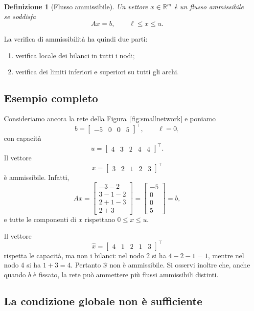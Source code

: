 \documentclass[11pt,a4paper]{article}
\newtheorem{definition}{Definizione}[section]
\newcommand{\R}{\mathbb{R}}
\begin{document}
\begin{definition}[Flusso ammissibile]
Un vettore $x\in\R^m$ è un flusso ammissibile se soddisfa
\[
  Ax=b,\qquad \ell\le x\le u.
\]
\end{definition}

La verifica di ammissibilità ha quindi due parti:
\begin{enumerate}
  \item verifica locale dei bilanci in tutti i nodi;
  \item verifica dei limiti inferiori e superiori su tutti gli archi.
\end{enumerate}

\subsection{Esempio completo}

Consideriamo ancora la rete della Figura~\ref{fig:smallnetwork} e poniamo
\[
  b=\begin{bmatrix}-5&0&0&5\end{bmatrix}^{\top},
  \qquad \ell=0,
\]
con capacità
\[
  u=\begin{bmatrix}4&3&2&4&4\end{bmatrix}^{\top}.
\]
Il vettore
\[
  x=\begin{bmatrix}3&2&1&2&3\end{bmatrix}^{\top}
\]
è ammissibile. Infatti,
\[
Ax=
\begin{bmatrix}
 -3-2\\
3-1-2\\
2+1-3\\
2+3
\end{bmatrix}
=
\begin{bmatrix}-5\\0\\0\\5\end{bmatrix}=b,
\]
e tutte le componenti di $x$ rispettano $0\le x\le u$.

Il vettore
\[
  \widehat{x}=\begin{bmatrix}4&1&2&1&3\end{bmatrix}^{\top}
\]
rispetta le capacità, ma non i bilanci: nel nodo 2 si ha $4-2-1=1$, mentre nel nodo 4 si ha $1+3=4$. Pertanto $\widehat{x}$ non è ammissibile. Si osservi inoltre che, anche quando $b$ è fissato, la rete può ammettere più flussi ammissibili distinti.

\subsection{La condizione globale non è sufficiente}
\end{document}
